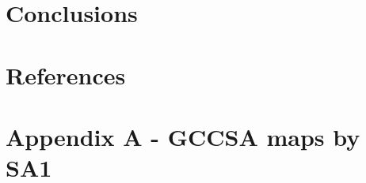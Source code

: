 \documentclass[preprint, 3p,
authoryear]{elsarticle} %
\begin{document}
\section{Conclusions}\label{conclusions}

\section*{References}\label{references}

\section{Appendix A - GCCSA maps by
SA1}\label{appendix-a---gccsa-maps-by-sa1}

\renewcommand\refname{Holding for spare stuff}

\end{document}
